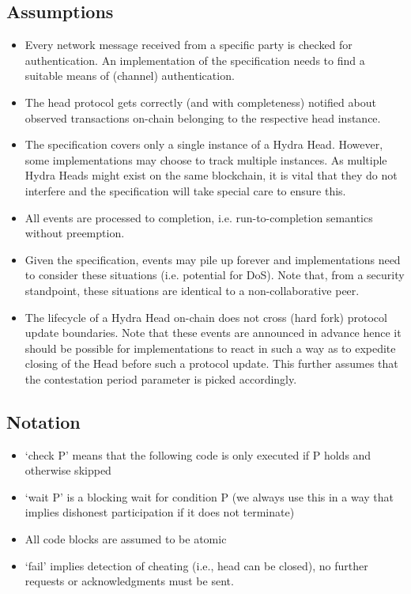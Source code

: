 \subsection{Assumptions}
\begin{itemize}
  \item Every network message received from a specific party is checked for
        authentication. An implementation of the specification needs to find a
        suitable means of (channel) authentication.
  \item The head protocol gets correctly (and with completeness) notified about
        observed transactions on-chain belonging to the respective head
        instance.
  \item The specification covers only a single instance of a Hydra Head.
        However, some implementations may choose to track multiple instances. As
        multiple Hydra Heads might exist on the same blockchain, it is vital
        that they do not interfere and the specification will take special care
        to ensure this.
  \item All events are processed to completion, i.e. run-to-completion semantics
        without preemption.
  \item Given the specification, events may pile up forever and implementations
        need to consider these situations (i.e. potential for DoS). Note that,
        from a security standpoint, these situations are identical to a
        non-collaborative peer.
  \item The lifecycle of a Hydra Head on-chain does not cross (hard fork)
        protocol update boundaries. Note that these events are announced in
        advance hence it should be possible for implementations to react in such
        a way as to expedite closing of the Head before such a protocol update.
        This further assumes that the contestation period parameter is picked
        accordingly.
\end{itemize}

\subsection{Notation}
\begin{itemize}
  \item ‘check P’ means that the following code is only executed if P holds and
        otherwise skipped
  \item ‘wait P’ is a blocking wait for condition P (we always use this in a way
        that implies dishonest participation if it does not terminate)
  \item All code blocks are assumed to be atomic
  \item ‘fail’ implies detection of cheating (i.e., head can be closed), no
        further requests or acknowledgments must be sent.
\end{itemize}



